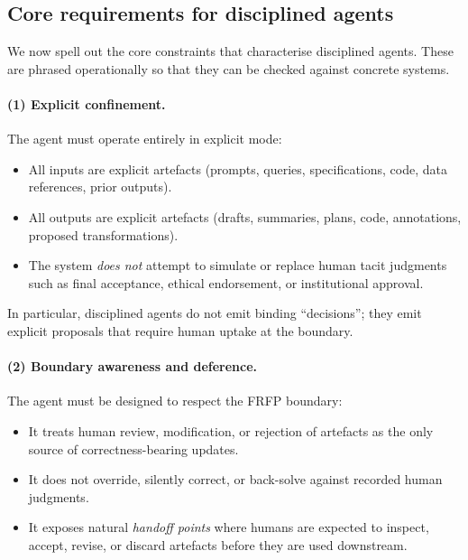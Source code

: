 \subsection{Core requirements for disciplined agents}

We now spell out the core constraints that characterise disciplined agents. These are phrased operationally so that they can be checked against concrete systems.

\paragraph{(1) Explicit confinement.}
The agent must operate entirely in explicit mode:
\begin{itemize}
  \item All inputs are explicit artefacts (prompts, queries, specifications, code, data references, prior outputs).
  \item All outputs are explicit artefacts (drafts, summaries, plans, code, annotations, proposed transformations).
  \item The system \emph{does not} attempt to simulate or replace human tacit judgments such as final acceptance, ethical endorsement, or institutional approval.
\end{itemize}
In particular, disciplined agents do not emit binding ``decisions''; they emit explicit proposals that require human uptake at the boundary.

\paragraph{(2) Boundary awareness and deference.}
The agent must be designed to respect the FRFP boundary:
\begin{itemize}
  \item It treats human review, modification, or rejection of artefacts as the only source of correctness-bearing updates.
  \item It does not override, silently correct, or back-solve against recorded human judgments.
  \item It exposes natural \emph{handoff points} where humans are expected to inspect, accept, revise, or discard artefacts before they are used downstream.
\end{itemize}

